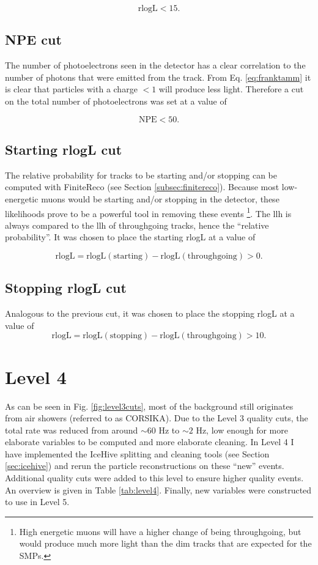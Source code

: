 \begin{equation}
\textrm{rlogL} < 15.
\end{equation}

\subsection{NPE cut}
The number of photoelectrons seen in the detector has a clear correlation to the number of photons that were emitted from the track. From Eq. \ref{eq:franktamm} it is clear that particles with a charge $< 1$ will produce less light. Therefore a cut on the total number of photoelectrons was set at a value of 

\begin{equation}
\textrm{NPE} < 50.
\end{equation} 


\subsection{Starting rlogL cut}
The relative probability for tracks to be starting and/or stopping can be computed with FiniteReco (see Section \ref{subsec:finitereco}). Because most low-energetic muons would be starting and/or stopping in the detector, these likelihoods prove to be a powerful tool in removing these events \footnote{High energetic muons will have a higher change of being throughgoing, but would produce much more light than the dim tracks that are expected for the SMPs.}. The llh is always compared to the llh of throughgoing tracks, hence the ``relative probability''. It was chosen to place the starting rlogL at a value of 

\begin{equation}
\textrm{rlogL} = \textrm{rlogL}(\textrm{starting}) - \textrm{rlogL}(\textrm{throughgoing}) > 0. 
\end{equation}

\subsection{Stopping rlogL cut}
Analogous to the previous cut, it was chosen to place the stopping rlogL at a value of
\begin{equation}
\textrm{rlogL} = \textrm{rlogL}(\textrm{stopping}) - \textrm{rlogL}(\textrm{throughgoing}) > 10. 
\end{equation}


\section{Level 4}
As can be seen in Fig. \ref{fig:level3cuts}, most of the background still originates from air showers (referred to as CORSIKA). Due to the Level 3 quality cuts, the total rate was reduced from around $\sim 60$ Hz to $\sim2$ Hz, low enough for more elaborate variables to be computed and more elaborate cleaning. In Level 4 I have implemented the IceHive splitting and cleaning tools (see Section \ref{sec:icehive}) and rerun the particle reconstructions on these ``new'' events. Additional quality cuts were added to this level to ensure higher quality events. An overview is given in Table \ref{tab:level4}. Finally, new variables were constructed to use in Level 5.

